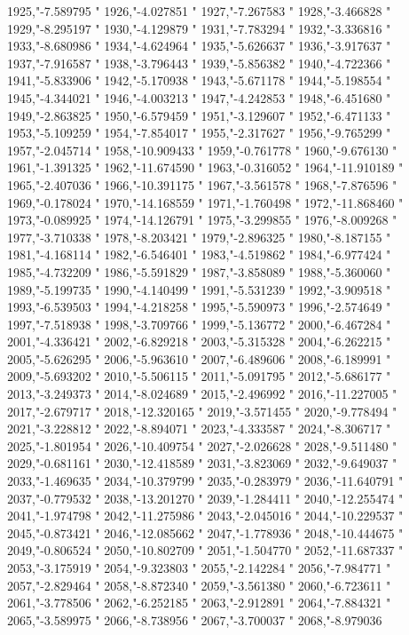 1925,"-7.589795
"
1926,"-4.027851
"
1927,"-7.267583
"
1928,"-3.466828
"
1929,"-8.295197
"
1930,"-4.129879
"
1931,"-7.783294
"
1932,"-3.336816
"
1933,"-8.680986
"
1934,"-4.624964
"
1935,"-5.626637
"
1936,"-3.917637
"
1937,"-7.916587
"
1938,"-3.796443
"
1939,"-5.856382
"
1940,"-4.722366
"
1941,"-5.833906
"
1942,"-5.170938
"
1943,"-5.671178
"
1944,"-5.198554
"
1945,"-4.344021
"
1946,"-4.003213
"
1947,"-4.242853
"
1948,"-6.451680
"
1949,"-2.863825
"
1950,"-6.579459
"
1951,"-3.129607
"
1952,"-6.471133
"
1953,"-5.109259
"
1954,"-7.854017
"
1955,"-2.317627
"
1956,"-9.765299
"
1957,"-2.045714
"
1958,"-10.909433
"
1959,"-0.761778
"
1960,"-9.676130
"
1961,"-1.391325
"
1962,"-11.674590
"
1963,"-0.316052
"
1964,"-11.910189
"
1965,"-2.407036
"
1966,"-10.391175
"
1967,"-3.561578
"
1968,"-7.876596
"
1969,"-0.178024
"
1970,"-14.168559
"
1971,"-1.760498
"
1972,"-11.868460
"
1973,"-0.089925
"
1974,"-14.126791
"
1975,"-3.299855
"
1976,"-8.009268
"
1977,"-3.710338
"
1978,"-8.203421
"
1979,"-2.896325
"
1980,"-8.187155
"
1981,"-4.168114
"
1982,"-6.546401
"
1983,"-4.519862
"
1984,"-6.977424
"
1985,"-4.732209
"
1986,"-5.591829
"
1987,"-3.858089
"
1988,"-5.360060
"
1989,"-5.199735
"
1990,"-4.140499
"
1991,"-5.531239
"
1992,"-3.909518
"
1993,"-6.539503
"
1994,"-4.218258
"
1995,"-5.590973
"
1996,"-2.574649
"
1997,"-7.518938
"
1998,"-3.709766
"
1999,"-5.136772
"
2000,"-6.467284
"
2001,"-4.336421
"
2002,"-6.829218
"
2003,"-5.315328
"
2004,"-6.262215
"
2005,"-5.626295
"
2006,"-5.963610
"
2007,"-6.489606
"
2008,"-6.189991
"
2009,"-5.693202
"
2010,"-5.506115
"
2011,"-5.091795
"
2012,"-5.686177
"
2013,"-3.249373
"
2014,"-8.024689
"
2015,"-2.496992
"
2016,"-11.227005
"
2017,"-2.679717
"
2018,"-12.320165
"
2019,"-3.571455
"
2020,"-9.778494
"
2021,"-3.228812
"
2022,"-8.894071
"
2023,"-4.333587
"
2024,"-8.306717
"
2025,"-1.801954
"
2026,"-10.409754
"
2027,"-2.026628
"
2028,"-9.511480
"
2029,"-0.681161
"
2030,"-12.418589
"
2031,"-3.823069
"
2032,"-9.649037
"
2033,"-1.469635
"
2034,"-10.379799
"
2035,"-0.283979
"
2036,"-11.640791
"
2037,"-0.779532
"
2038,"-13.201270
"
2039,"-1.284411
"
2040,"-12.255474
"
2041,"-1.974798
"
2042,"-11.275986
"
2043,"-2.045016
"
2044,"-10.229537
"
2045,"-0.873421
"
2046,"-12.085662
"
2047,"-1.778936
"
2048,"-10.444675
"
2049,"-0.806524
"
2050,"-10.802709
"
2051,"-1.504770
"
2052,"-11.687337
"
2053,"-3.175919
"
2054,"-9.323803
"
2055,"-2.142284
"
2056,"-7.984771
"
2057,"-2.829464
"
2058,"-8.872340
"
2059,"-3.561380
"
2060,"-6.723611
"
2061,"-3.778506
"
2062,"-6.252185
"
2063,"-2.912891
"
2064,"-7.884321
"
2065,"-3.589975
"
2066,"-8.738956
"
2067,"-3.700037
"
2068,"-8.979036
